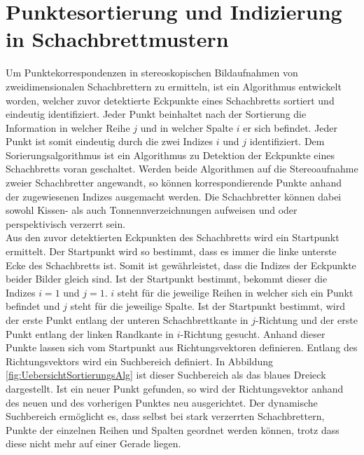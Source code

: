 \chapter{Punktesortierung und Indizierung in Schachbrettmustern}
\label{sec:schachbrettAlg} 


Um Punktekorrespondenzen in stereoskopischen Bildaufnahmen von zweidimensionalen Schachbrettern zu ermitteln, ist ein Algorithmus entwickelt worden, welcher zuvor detektierte Eckpunkte eines Schachbretts sortiert und eindeutig identifiziert. Jeder Punkt beinhaltet nach der Sortierung die Information in welcher Reihe $j$ und in welcher Spalte $i$ er sich befindet. Jeder Punkt ist somit eindeutig durch die zwei Indizes $i$ und $j$ identifiziert. Dem Sorierungsalgorithmus ist ein Algorithmus zu Detektion der Eckpunkte eines Schachbretts voran geschaltet. Werden beide Algorithmen auf die Stereoaufnahme zweier Schachbretter angewandt, so können korrespondierende Punkte anhand der zugewiesenen Indizes ausgemacht werden. Die Schachbretter können dabei sowohl Kissen- als auch Tonnennverzeichnungen aufweisen und oder perspektivisch verzerrt sein.\\ 





Aus den zuvor detektierten Eckpunkten des Schachbretts wird ein Startpunkt ermittelt. Der Startpunkt wird so bestimmt, dass es immer die linke unterste Ecke des Schachbretts ist. Somit ist gewährleistet, dass die Indizes der Eckpunkte beider Bilder gleich sind. Ist der Startpunkt bestimmt, bekommt dieser die Indizes $i = 1$ und $j = 1$. $i$ steht für die jeweilige Reihen in welcher sich ein Punkt befindet und $j$ steht für die jeweilige Spalte. Ist der Startpunkt bestimmt, wird der erste Punkt entlang der unteren Schachbrettkante in $j$-Richtung und der erste Punkt entlang der linken Randkante in $i$-Richtung gesucht. Anhand dieser Punkte lassen sich vom Startpunkt aus Richtungsvektoren definieren. Entlang des Richtungsvektors wird ein Suchbereich definiert. In Abbildung \ref{fig:UebersichtSortierungsAlg} ist dieser Suchbereich als das blaues Dreieck dargestellt. Ist ein neuer Punkt gefunden, so wird der Richtungsvektor anhand des neuen und des vorherigen Punktes neu ausgerichtet. Der dynamische Suchbereich ermöglicht es, dass selbst bei stark verzerrten Schachbrettern, Punkte der einzelnen Reihen und Spalten geordnet werden können, trotz dass diese nicht mehr auf einer Gerade liegen.

